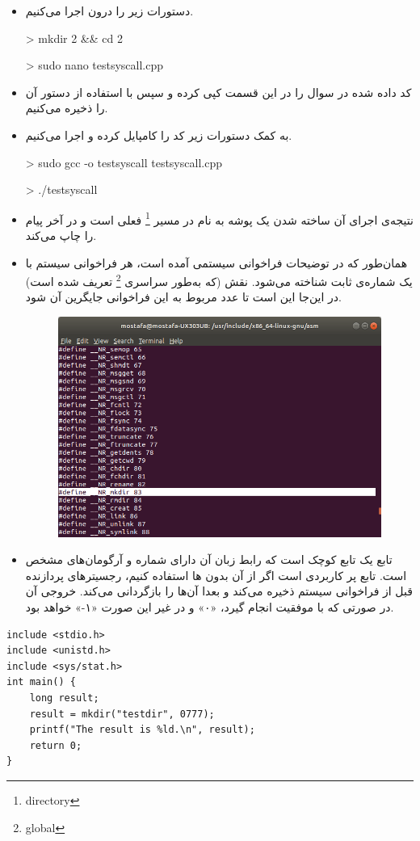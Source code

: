 \begin{itemize}
	\item 
	دستورات زیر را درون  اجرا می‌کنیم.
	
	\begin{code}
		> mkdir 2 \&\& cd 2
		
		> sudo nano testsyscall.cpp
		
		
	\end{code}

	\item کد داده شده در سوال را در این قسمت کپی کرده و سپس با استفاده از دستور  آن را ذخیره می‌کنیم.
	
	\item به کمک دستورات زیر کد را کامپایل کرده و اجرا می‌کنیم.
	
	\begin{code}
		> sudo gcc -o testsyscall testsyscall.cpp 
		
		> ./testsyscall
	\end{code}

	\item نتیجه‌ی اجرای آن ساخته شدن یک پوشه به نام  در مسیر   \footnote{directory} فعلی است و در آخر پیام  را چاپ می‌کند.
	
	\item 
	همان‌طور که در توضیحات فراخوانی سیستمی آمده است، هر فراخوانی سیستم با یک شماره‌ی ثابت شناخته می‌شود. نقش  (که به‌طور سراسری \footnote{global} تعریف شده است) در این‌جا این است تا عدد مربوط به این فراخوانی جایگرین آن شود.
	
	\begin{figure}[h!]
		\centering
		\includegraphics[scale=.4]{img/2.png}
	\end{figure}
	
	\item تابع  یک تابع کوچک است که رابط زبان  آن دارای شماره و آرگومان‌های مشخص است. تابع پر کاربردی است اگر از آن بدون ها استفاده کنیم، رجسیترهای پردازنده قبل از فراخوانی سیستم ذخیره می‌کند و بعدا آن‌ها را بازگردانی می‌کند. خروجی آن در صورتی که با موفقیت انجام گیرد، «۰» و در غیر این صورت «۱-» خواهد بود.
\end{itemize}

	
	\begin{Verbatim}[tabsize=4]
include <stdio.h>
include <unistd.h>
include <sys/stat.h>
int main() {
	long result;
	result = mkdir("testdir", 0777);
	printf("The result is %ld.\n", result);
	return 0;
}
	\end{Verbatim}